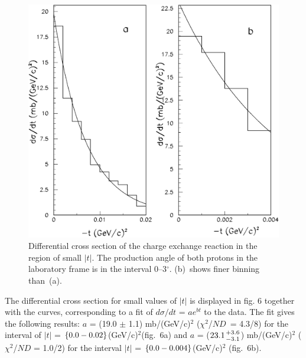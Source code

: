 \documentclass[epj]{svjour}
\begin{document}
\begin{figure}
  \centering
  \includegraphics[width=0.92\columnwidth]{fig6.pdf}
  \caption{Differential cross section of the charge exchange reaction in the
    region of small $\vert t \vert$. The production angle of both protons in the
    laboratory frame is in the interval 0--3$^{\circ}$. (b)~shows finer binning
    than~(a).}
\end{figure}

The differential cross section for small values of $\vert t\vert$ is displayed
in fig. 6 together with the curves, corresponding to a fit of $d\sigma/dt$ =
$ae^{bt}$ to the data. The fit gives the following results: $a$ = (19.0 $\pm$
1.1) mb/(GeV/c)$^2$ ($\chi^2$/$ND$~= 4.3/8) for the interval of $\vert t\vert$ =
$\lbrace 0.0\--0.02\rbrace$(GeV/c)$^2$(fig.~6a) and $a$ =
($23.1\genfrac{}{}{0pt}{}{+3.6}{-3.1}$) mb/(GeV/c)$^2$ ($\chi^2$/$ND$ = 1.0/2)
for the interval $\vert t\vert$ = $\lbrace 0.0\--0.004 \rbrace$(GeV/c)$^2$
(fig.~6b).
\end{document}
